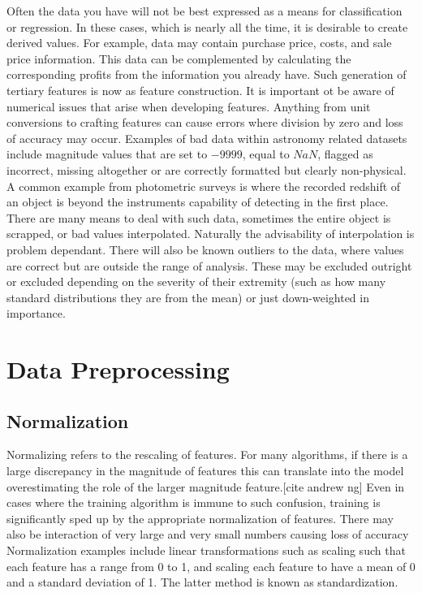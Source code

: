 Often the data you have will not be best expressed as a means for classification or regression.
In these cases, which is nearly all the time, it is desirable to create derived values. 
For
example, data may contain purchase price, costs, and sale price information. 
This data can be complemented by calculating the corresponding profits from the information you already have.
Such generation of tertiary features is now as feature construction.
It is important ot be aware of numerical issues that arise when developing features.
Anything from unit conversions to crafting features can cause errors where division by zero and loss of accuracy may occur.
Examples of bad data within astronomy related datasets include magnitude values that are set to $-9999$, equal to $NaN$, flagged as incorrect, missing altogether or are correctly formatted but clearly non-physical.
A common example from photometric surveys is where the recorded redshift of an object is beyond the instruments capability of detecting in the first place.
There are many means to deal with such data, sometimes the entire object is scrapped, or bad values interpolated.
Naturally the advisability of interpolation is problem dependant.
There will also be known outliers to the data, where values are correct but are outside the range of analysis.
These may be excluded outright or excluded depending on the severity of their extremity (such as how many standard distributions they are from the mean) or just down-weighted in importance.


\section{Data Preprocessing}

	\subsection{Normalization}

Normalizing refers to the rescaling of features.
For many algorithms, if there is a large discrepancy in the magnitude of features this can translate into the model overestimating the role of the larger magnitude feature.[cite andrew ng]
Even in cases where the training algorithm is immune to such confusion, training is significantly sped up by the appropriate normalization of features.
There may also be interaction of very large and very small numbers causing loss of accuracy
Normalization examples include linear transformations such as scaling such that each feature has a range from 0 to 1, and scaling each feature to have a  mean of 0 and a standard deviation of 1.
The latter method is known as standardization.

